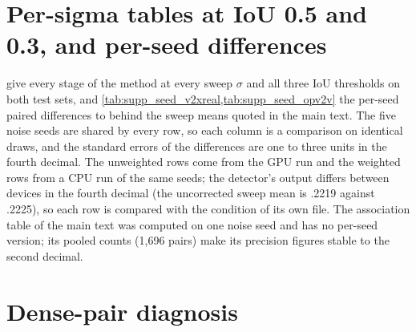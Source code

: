 \section{Per-sigma tables at IoU 0.5 and 0.3, and per-seed differences}
\label{sec:supp_tables}

 give every stage of the method at every sweep $\sigma$ and all three IoU thresholds on both test sets, and \cref{tab:supp_seed_v2xreal,tab:supp_seed_opv2v} the per-seed paired differences to \freealign behind the sweep means quoted in the main text. The five noise seeds are shared by every row, so each column is a comparison on identical draws, and the standard errors of the differences are one to three units in the fourth decimal. The unweighted rows come from the GPU run and the weighted rows from a CPU run of the same seeds; the detector's output differs between devices in the fourth decimal (the uncorrected sweep mean is .2219 against .2225), so each row is compared with the \freealign condition of its own file. The association table of the main text was computed on one noise seed and has no per-seed version; its pooled counts (1,696 pairs) make its precision figures stable to the second decimal.






\section{Dense-pair diagnosis}
\label{sec:supp_dense}

